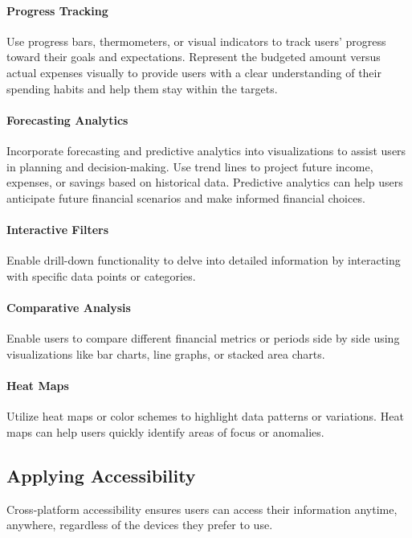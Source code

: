 \paragraph{Progress Tracking}
Use progress bars, thermometers, or visual indicators to track users' progress toward their goals and expectations. 
Represent the budgeted amount versus actual expenses visually to provide users with a clear understanding of their 
spending habits and help them stay within the targets.

\paragraph{Forecasting Analytics}
Incorporate forecasting and predictive analytics into visualizations to assist users in planning and decision-making.
Use trend lines to project future income, expenses, or savings based on historical data. Predictive analytics can help 
users anticipate future financial scenarios and make informed financial choices.

\paragraph{Interactive Filters}
Enable drill-down functionality to delve into detailed information by interacting with specific data points or 
categories.

\paragraph{Comparative Analysis}
Enable users to compare different financial metrics or periods side by side using visualizations like bar charts, 
line graphs, or stacked area charts.

\paragraph{Heat Maps}
Utilize heat maps or color schemes to highlight data patterns or variations. Heat maps can help users quickly identify 
areas of focus or anomalies.


\subsection{Applying Accessibility}

Cross-platform accessibility ensures users can access their information anytime, anywhere, regardless of the devices 
they prefer to use.

